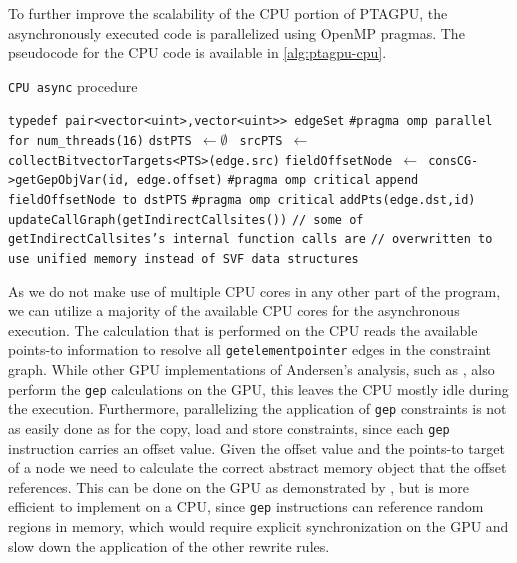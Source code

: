 To further improve the scalability of the CPU portion of PTAGPU, the asynchronously executed code is parallelized using OpenMP pragmas.
The pseudocode for the CPU code is available in \autoref{alg:ptagpu-cpu}.
\begin{algorithm}
    \caption[CPU Async Procedure Pseudocode]{\texttt{CPU async} procedure}\label{alg:ptagpu-cpu}
    \begin{algorithmic}
        \State \texttt{typedef pair<vector<uint>,vector<uint>> edgeSet} 
        \State \texttt{\#pragma omp parallel for num\_threads(16)}
        \State \texttt{dstPTS $\leftarrow \emptyset$ }
        \State \texttt{srcPTS $\leftarrow$ collectBitvectorTargets<PTS>(edge.src)}
        \State \texttt{fieldOffsetNode $\leftarrow$ consCG->getGepObjVar(id, edge.offset)}
        \State \texttt{\#pragma omp critical} 
        \State \texttt{append fieldOffsetNode to dstPTS}
        \EndFor
        \State \texttt{\#pragma omp critical}
        \State \texttt{addPts(edge.dst,id)}
        \EndFor
        \EndFor
        \State \texttt{updateCallGraph(getIndirectCallsites())} 
        \State \texttt{// some of getIndirectCallsites's internal function calls are}
        \State \texttt{// overwritten to use unified memory instead of SVF data structures}
        \EndProcedure
    \end{algorithmic}
\end{algorithm}
As we do not make use of multiple CPU cores in any other part of the program, we can utilize a majority of the available CPU cores for the asynchronous execution.
The calculation that is performed on the CPU reads the available points-to information to resolve all \verb|getelementpointer| edges in the constraint graph.
While other GPU implementations of Andersen's analysis, such as \cite{mendez2012gpu}, also perform the \verb|gep| calculations on the GPU, this leaves the CPU mostly idle during the execution.
Furthermore, parallelizing the application of \verb|gep| constraints is not as easily done as for the copy, load and store constraints, since each \verb|gep| instruction carries an offset value. Given the offset value and the points-to target of a node we need to calculate the correct abstract memory object that the offset references. This can be done on the GPU as demonstrated by \cite{mendez2012gpu}, but is more efficient to implement on a CPU, since \verb|gep| instructions can reference random regions in memory, which would require explicit synchronization on the GPU and slow down the application of the other rewrite rules.
